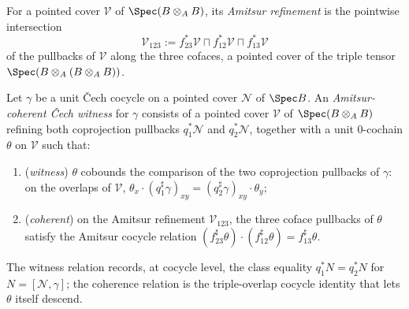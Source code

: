 \begin{definition}
  \label{def:amitsurCover}
  \leanok
  For a pointed cover \(\mathcal V\) of \(\Spec(B \otimes_A B)\), its \emph{Amitsur refinement}
  is the pointwise intersection
  \[
    \mathcal V_{123} := f_{23}^{*}\mathcal V \sqcap f_{12}^{*}\mathcal V \sqcap f_{13}^{*}\mathcal V
  \]
  of the pullbacks of \(\mathcal V\) along the three cofaces, a pointed cover of the triple
  tensor \(\Spec(B \otimes_A (B \otimes_A B))\).
\end{definition}

\begin{definition}
  \label{def:CoherentCechWitness}
  \leanok
  Let \(\gamma\) be a unit \v Cech cocycle on a pointed cover \(\mathcal N\) of \(\Spec B\). An
  \emph{Amitsur-coherent \v Cech witness} for \(\gamma\) consists of a pointed cover
  \(\mathcal V\) of \(\Spec(B \otimes_A B)\) refining both coprojection pullbacks
  \(q_1^{*}\mathcal N\) and \(q_2^{*}\mathcal N\), together with a unit \(0\)-cochain
  \(\theta\) on \(\mathcal V\) such that:
  \begin{enumerate}
    \item (\emph{witness}) \(\theta\) cobounds the comparison of the two coprojection pullbacks
      of \(\gamma\): on the overlaps of \(\mathcal V\),
      \(\theta_x \cdot (q_1^{\sharp}\gamma)_{xy} = (q_2^{\sharp}\gamma)_{xy} \cdot \theta_y\);
    \item (\emph{coherent}) on the Amitsur refinement \(\mathcal V_{123}\), the three coface
      pullbacks of \(\theta\) satisfy the Amitsur cocycle relation
      \((f_{23}^{\sharp}\theta) \cdot (f_{12}^{\sharp}\theta) = f_{13}^{\sharp}\theta\).
  \end{enumerate}
  The witness relation records, at cocycle level, the class equality
  \(q_1^{*} N = q_2^{*} N\) for \(N = [\mathcal N, \gamma]\); the coherence relation is the
  triple-overlap cocycle identity that lets \(\theta\) itself descend.
\end{definition}

